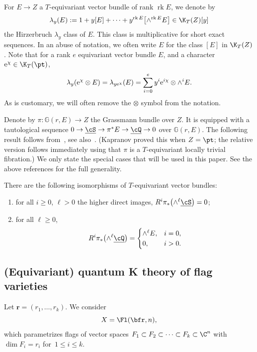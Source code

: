For $E \to Z$ a $T$-equivariant
vector bundle of rank $\operatorname{rk}E$, we denote by
\[ \lambda_y(E) := 1 + y [E] + \dots + y^{\operatorname{rk}E} \bigl[\wedge^{\operatorname{rk}E} E\bigr] \in \K_T(Z)[y] \]
the Hirzerbruch $\lambda_y$ class of $E$. This class is multiplicative for short exact sequences. {In an abuse of notation, we often write $E$ for the class $[E]$ in $\K_T(Z)$.} Note that for a rank $e$ equivariant vector bundle $E$, and a character ${\rm e}^\chi \in \K_T(\pt)$,
\[ \lambda_y( {\rm e}^\chi \otimes E) = \lambda_{y {\rm e}^{\chi}}(E) = \sum_{i=0}^{e} y^i {\rm e}^{i \chi} \otimes \wedge^i E . \]
As is customary, we will often remove the $\otimes$ symbol from the notation.

Denote by
$\pi\colon \mathbb{G}(r,E) \to Z$ the Grassmann bundle over $Z$.
It is equipped with a tautological sequence
$0 \to \underline{\cS} \to \pi^* E \to \underline{\cQ} \to 0$ over
$\mathbb{G}(r,E)$. The following result follows
from~\cite[Proposition~2.2]{kapranov:Gr}, see also~\cite[Proposition~3.2 and Corollary~3.3]{gu2022quantum}.
(Kapranov proved this when $Z=\pt$; the relative version follows immediately
using that $\pi$ is a $T$-equivariant locally trivial fibration.) We only state the special cases that will be used in this paper. See the above references for the full generality.

\begin{Proposition}[Kapranov]\label{prop:relativeBWB}
 There are the following isomorphisms of $T$-equivariant vector bundles:
 \begin{enumerate}\itemsep=0pt
 \item[$(1)$] for all $i \ge 0$, $\ell>0$ the higher direct images, $R^i \pi_* \bigl(\wedge^\ell\underline{\cS}\bigr) = 0$;
 \item[$(2)$] for all $\ell\geq 0$, \[ R^i \pi_*\bigl(\wedge^\ell\underline{\cQ}\bigr) = \begin{cases} \wedge^\ell E, & i=0, \\ 0, & i>0 . \end{cases}\]
 \end{enumerate}
 \end{Proposition}

\subsection{(Equivariant) quantum K theory of flag varieties}\label{sec:prelim}
Let $\mathbf{r}= (r_1, \dots, r_k)$. We consider \[X=\Fl(\bfr,n),\] which parametrizes flags of vector spaces
$F_{1} \subset F_{2} \subset \dots \subset F_{k} \subset \C^n$
with $\dim F_{i} = r_i$ for~${1 \le i \le k}$.

